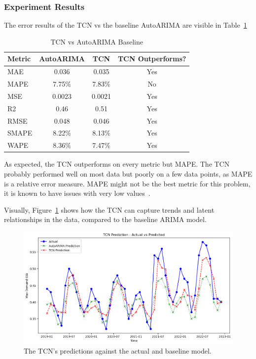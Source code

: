 \documentclass{ieeeaccess}
\begin{document}
\subsubsection{Experiment Results}

The error results of the TCN vs the baseline AutoARIMA are visible in Table~\ref{tab:metrics_comparison}
\begin{table}[h]
\centering
\caption{TCN vs AutoARIMA Baseline}
\begin{tabular}{lccc}
\hline
Metric & AutoARIMA & TCN & TCN Outperforms? \\
\hline
MAE & 0.036 & 0.035 & Yes \\
MAPE & 	7.75\% & 7.83\% & No \\
MSE & 0.0023 & 0.0021 & Yes \\
R2 & 0.46 & 0.51 & Yes \\
RMSE & 0.048 & 0.046 & Yes \\
SMAPE & 8.22\% & 8.13\% & Yes \\
WAPE & 8.36\% & 7.47\% & Yes \\
\hline
\end{tabular}
\label{tab:metrics_comparison}
\end{table}

As expected, the TCN outperforms on every metric but MAPE. The TCN probably performed well on most data but poorly on a few data points, as MAPE is a relative error measure. MAPE might not be the best metric for this problem, it is known to have issues with very low values~\cite{scikitMAPE}.

Visually, Figure~\ref{fig:tcnpredictions} shows how the TCN can capture trends and latent relationships in the data, compared to the baseline ARIMA model.
\begin{figure}[htb]
    \centering
    \includegraphics[width=\columnwidth]{Model-TCN/TCN_Actual_Vs_predicted.png}
    \caption{The TCN's predictions against the actual and baseline model.}
    \label{fig:tcnpredictions}
\end{figure}
\end{document}
